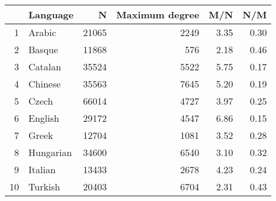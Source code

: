 \begin{table}[ht]
\centering
\begin{tabular}{rlrrrr}
  \hline
 & Language & N & Maximum degree & M/N & N/M \\ 
  \hline
1 & Arabic & 21065 & 2249 & 3.35 & 0.30 \\ 
  2 & Basque & 11868 & 576 & 2.18 & 0.46 \\ 
  3 & Catalan & 35524 & 5522 & 5.75 & 0.17 \\ 
  4 & Chinese & 35563 & 7645 & 5.20 & 0.19 \\ 
  5 & Czech & 66014 & 4727 & 3.97 & 0.25 \\ 
  6 & English & 29172 & 4547 & 6.86 & 0.15 \\ 
  7 & Greek & 12704 & 1081 & 3.52 & 0.28 \\ 
  8 & Hungarian & 34600 & 6540 & 3.10 & 0.32 \\ 
  9 & Italian & 13433 & 2678 & 4.23 & 0.24 \\ 
  10 & Turkish & 20403 & 6704 & 2.31 & 0.43 \\ 
   \hline
\end{tabular}
\end{table}
